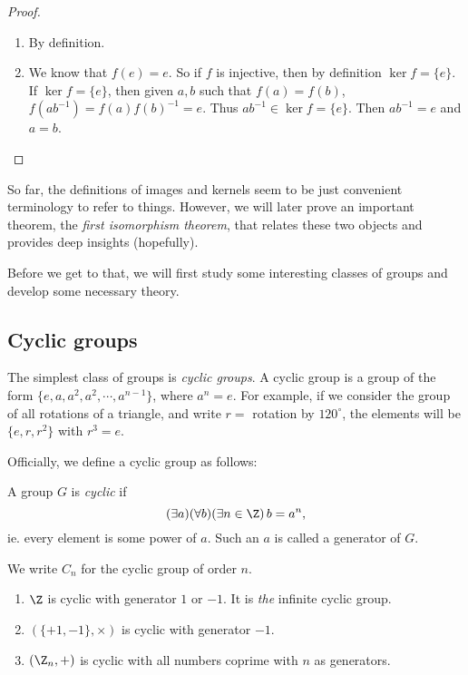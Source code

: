 \documentclass[a4paper]{article}
\begin{document}
\begin{proof}\leavevmode
  \begin{enumerate}
    \item By definition.
    \item We know that $f(e) = e$. So if $f$ is injective, then by definition $\ker f = \{e\}$. If $\ker f = \{e\}$, then given $a, b$ such that $f(a) = f(b)$, $f(ab^{-1}) = f(a)f(b)^{-1} = e$. Thus $ab^{-1}\in \ker f = \{e\}$. Then $ab^{-1} = e$ and $a = b$.
  \end{enumerate}
\end{proof}

So far, the definitions of images and kernels seem to be just convenient terminology to refer to things. However, we will later prove an important theorem, the \emph{first isomorphism theorem}, that relates these two objects and provides deep insights (hopefully).

Before we get to that, we will first study some interesting classes of groups and develop some necessary theory.

\subsection{Cyclic groups}
The simplest class of groups is \emph{cyclic groups}. A cyclic group is a group of the form $\{e, a, a^2, a^2, \cdots, a^{n - 1}\}$, where $a^n = e$. For example, if we consider the group of all rotations of a triangle, and write $r = $ rotation by $120^\circ$, the elements will be $\{e, r, r^2\}$ with $r^3 = e$.

Officially, we define a cyclic group as follows:
\begin{defi}
  A group $G$ is \emph{cyclic} if
  \[
    (\exists a)(\forall b)(\exists n\in\Z)\, b = a^n,
  \]
  ie. every element is some power of $a$. Such an $a$ is called a generator of $G$.

  We write $C_n$ for the cyclic group of order $n$.
\end{defi}

\begin{eg}\leavevmode
  \begin{enumerate}
    \item $\Z$ is cyclic with generator $1$ or $-1$. It is \emph{the} infinite cyclic group.
    \item $(\{+1, -1\}, \times)$ is cyclic with generator $-1$.
    \item $(\Z_n, +)$ is cyclic with all numbers coprime with $n$ as generators.
  \end{enumerate}
\end{eg}
\end{document}
